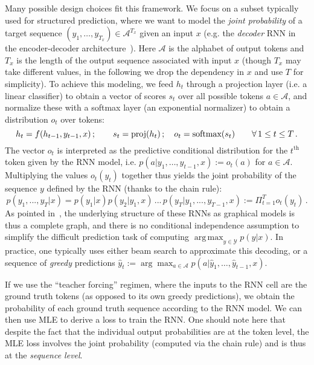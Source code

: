 \documentclass{article}
\DeclareMathOperator*{\argmax}{arg\,max}
\begin{document}
	Many possible design choices fit this framework.
	We focus on a subset typically used for structured prediction, where we want to model the \emph{joint probability} of a target sequence $(y_1, \ldots, y_{T_x}) \in \mathcal{A}^{T_x}$ given an input $x$ (e.g. the \emph{decoder} RNN in the encoder-decoder architecture~\citep{Sutskever2014, Cho2014}).
	Here $\mathcal{A}$ is the alphabet of output tokens and $T_x$ is the length of the output sequence associated with input $x$ (though $T_x$ may take different values, in the following we drop the dependency in $x$ and use $T$ for simplicity).
	To achieve this modeling, we feed $h_t$ through a projection layer (i.e. a linear classifier) to obtain a vector of scores $s_t$ over all possible tokens $a \in \mathcal{A}$, and normalize these with a softmax layer (an exponential normalizer) to obtain a distribution $o_t$ over tokens:
	\begin{equation}
	h_t = f(h_{t-1}, y_{t-1}, x) \,; \qquad s_t=\textnormal{proj}(h_t)\,; \quad o_t = \textnormal{softmax}(s_t)  \qquad \forall \, 1\leq t \leq T \,.
	\end{equation}
	The vector $o_t$ is interpreted as the predictive conditional distribution for the $t^{\text{th}}$ token given by the RNN model, i.e. $p(a | y_1, \ldots, y_{t-1},x) := o_t(a)$ for $a \in \mathcal{A}$.
	Multiplying the values $o_t(y_t)$ together thus yields the joint probability of the sequence $y$ defined by the RNN (thanks to the chain rule):
	\begin{equation}
	p(y_1, ..., y_T | x) = p(y_1 | x) p(y_2 | y_1, x)\,... \,p(y_T | y_1, ..., y_{T-1}, x) := \Pi_{t=1}^T o_t(y_t) \, .
	\end{equation}
	As pointed in~\citet{Goodfellow2016}, the underlying structure of these RNNs as graphical models is thus a complete graph, and there is no conditional independence assumption to simplify the difficult prediction task of computing $\argmax_{y \in \mathcal{Y}} p(y|x)$. In practice, one typically uses either beam search to approximate this decoding, or a sequence of \emph{greedy} predictions $\hat{y}_t := \arg\max_{a \in \mathcal{A}} p(a|\hat{y}_1, \ldots, \hat{y}_{t-1}, x)$.

	If we use the ``teacher forcing'' regimen, where the inputs to the RNN cell are the ground truth tokens (as opposed to its own greedy predictions), we obtain the probability of each ground truth sequence according to the RNN model.
	We can then use MLE to derive a loss to train the RNN.
	One should note here that despite the fact that the individual output probabilities are at the token level, the MLE loss involves the joint probability (computed via the chain rule) and is thus at the \textit{sequence level}.
\end{document}
